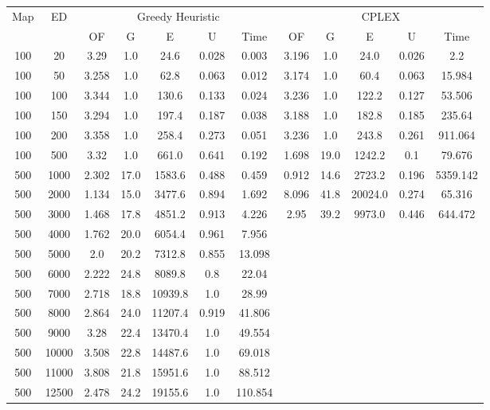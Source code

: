 \begin{table}[htb]
	\centering
	\begin{tabular}{|c|c|c|c|c|c|c|c|c|c|c|c|}
		\hline
		\multirow{2}{*}{Map} & \multirow{2}{*}{ED} & \multicolumn{5}{c|}{Greedy Heuristic} & \multicolumn{5}{c|}{CPLEX}\\ 
		\cline{3-12}
&& OF & G & E & U & Time & OF & G & E & U & Time\\ 
		\hline
		100 & 20 & 3.29 & 1.0 & 24.6 & 0.028 & 0.003 & 3.196 & 1.0 & 24.0 & 0.026 & 2.2 \\ 
		100 & 50 & 3.258 & 1.0 & 62.8 & 0.063 & 0.012 & 3.174 & 1.0 & 60.4 & 0.063 & 15.984 \\ 
		100 & 100 & 3.344 & 1.0 & 130.6 & 0.133 & 0.024 & 3.236 & 1.0 & 122.2 & 0.127 & 53.506 \\ 
		100 & 150 & 3.294 & 1.0 & 197.4 & 0.187 & 0.038 & 3.188 & 1.0 & 182.8 & 0.185 & 235.64 \\ 
		100 & 200 & 3.358 & 1.0 & 258.4 & 0.273 & 0.051 & 3.236 & 1.0 & 243.8 & 0.261 & 911.064 \\ 
		100 & 500 & 3.32 & 1.0 & 661.0 & 0.641 & 0.192 & 1.698 & 19.0 & 1242.2 & 0.1 & 79.676 \\ 
		500 & 1000 & 2.302 & 17.0 & 1583.6 & 0.488 & 0.459 & 0.912 & 14.6 & 2723.2 & 0.196 & 5359.142 \\ 
		500 & 2000 & 1.134 & 15.0 & 3477.6 & 0.894 & 1.692 & 8.096 & 41.8 & 20024.0 & 0.274 & 65.316 \\ 
		500 & 3000 & 1.468 & 17.8 & 4851.2 & 0.913 & 4.226 & 2.95 & 39.2 & 9973.0 & 0.446 & 644.472 \\ 
		500 & 4000 & 1.762 & 20.0 & 6054.4 & 0.961 & 7.956 & & & & &  \\ 
		500 & 5000 & 2.0 & 20.2 & 7312.8 & 0.855 & 13.098 & & & & &  \\ 
		500 & 6000 & 2.222 & 24.8 & 8089.8 & 0.8 & 22.04 & & & & &  \\ 
		500 & 7000 & 2.718 & 18.8 & 10939.8 & 1.0 & 28.99 & & & & &  \\ 
		500 & 8000 & 2.864 & 24.0 & 11207.4 & 0.919 & 41.806 & & & & &  \\ 
		500 & 9000 & 3.28 & 22.4 & 13470.4 & 1.0 & 49.554 & & & & &  \\ 
		500 & 10000 & 3.508 & 22.8 & 14487.6 & 1.0 & 69.018 & & & & &  \\ 
		500 & 11000 & 3.808 & 21.8 & 15951.6 & 1.0 & 88.512 & & & & &  \\ 
		500 & 12500 & 2.478 & 24.2 & 19155.6 & 1.0 & 110.854 & & & & &  \\ 

\end{tabular}
\end{table}
